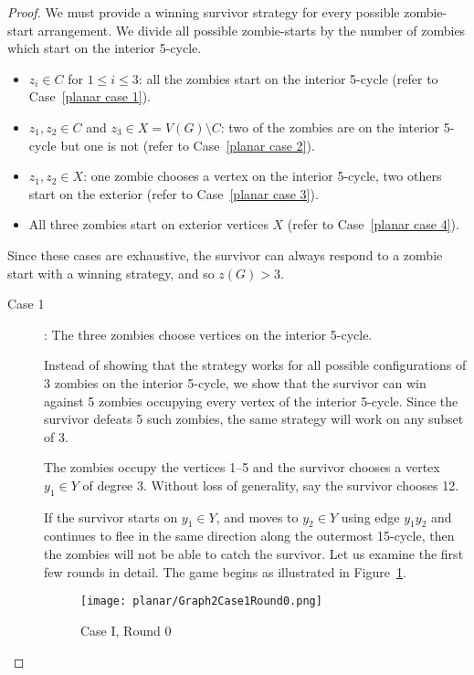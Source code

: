 \begin{proof}
  We must provide a winning survivor strategy for every possible zombie-start arrangement. We divide all possible zombie-starts by the number of zombies which start on the
  interior 5-cycle.

  \begin{itemize}
  \item $z_i \in C$ for $1 \leq i \leq 3$: all the zombies start on the interior 5-cycle (refer to Case~\ref{planar case 1}).
  \item $z_1, z_2 \in C$ and $z_3 \in X = V(G) \setminus C$: two of the zombies are on the interior 5-cycle but one is not (refer to Case~\ref{planar case 2}).
  \item $z_1, z_2 \in X$:  one zombie chooses a vertex on the interior 5-cycle, two others start on the exterior (refer to Case~\ref{planar case 3}).
  \item All three zombies start on exterior vertices $X$ (refer to Case~\ref{planar case 4}).
  \end{itemize}

  Since these cases are exhaustive, the survivor can always respond to a zombie start with a winning
  strategy, and so $z(G) > 3$.

  \begin{description}
\item[Case 1 \label{planar case 1}]: The three zombies choose vertices on the interior 5-cycle.

Instead of showing that the strategy works for all possible configurations of 3 zombies on the interior 5-cycle,
we show that the survivor can win against 5 zombies occupying every vertex of the interior 5-cycle.
Since the survivor defeats 5 such zombies, the same strategy will work on any subset of 3.

The zombies occupy the vertices 1--5 and the survivor chooses a vertex $y_1 \in Y$ of degree 3.
Without loss of generality, say the survivor chooses 12.

If the survivor starts on $y_1 \in Y$, and moves to $y_2\in Y$ using edge $y_1y_2$ and continues to flee in the same direction along the outermost 15-cycle, then the zombies will not be able to catch the survivor. Let us examine the first few rounds in detail. The game begins as illustrated in Figure~\ref{fig:planarG2C1R0}.

\begin{figure}
\centering
\texttt{[image: planar/Graph2Case1Round0.png]}
\caption{Case I, Round 0\label{fig:planarG2C1R0}}
\end{figure}


\end{description}
\end{proof}
